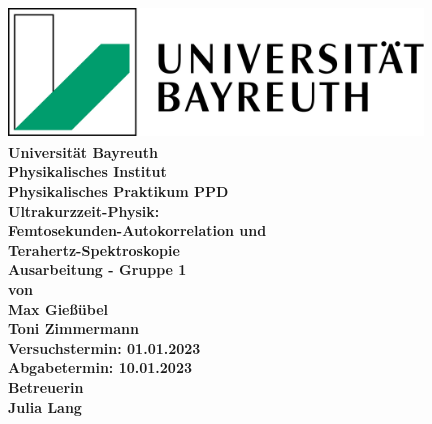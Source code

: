 \documentclass{article}               %
\begin{document}
  \setlength{\parindent}{0em}
    \begin{titlepage}
        \centering
        \includegraphics[width=11cm,height=3.5cm,angle=0]{LogoUniBayreuth.png}
        \vspace{0.5cm}
        {\large \textbf{\\Universität Bayreuth\\Physikalisches Institut\\Physikalisches Praktikum PPD}\\}
        \vspace{2.5cm}
        {\Huge \textbf{Ultrakurzzeit-Physik:\\Femtosekunden-Autokorrelation und\\Terahertz-Spektroskopie}\\}
        \vspace{2.5cm}
        {\LARGE \textbf{Ausarbeitung - Gruppe 1}\\}
        \vspace{0.5cm}
        {\large \textbf{von}\\}
        {\LARGE \textbf{Max Gießübel}\\}
        {\LARGE \textbf{Toni Zimmermann}\\} 	
        \vspace{2cm}
        {\large \textbf{Versuchstermin: 01.01.2023}\\}
        {\large \textbf{Abgabetermin: 10.01.2023}\\}
        \vspace{2cm}
        {\large \textbf{Betreuerin\\}}
        {\LARGE \textbf{Julia Lang\\}}
        \vfill
    \end{titlepage}
    
    \tableofcontents
    \newpage
    
    
    \newpage
    
    \newpage
    
    \newpage
    
    \newpage
    
    \newpage
    \printbibliography
\end{document}
